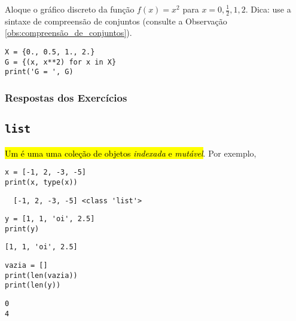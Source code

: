 \begin{exer}
  Aloque o gráfico discreto da função $f(x) = x^2$ para $x=0, \frac{1}{2}, 1, 2$. Dica: use a sintaxe de compreensão de conjuntos (consulte a Observação \ref{obs:compreensão_de_conjuntos}).
\end{exer}

\begin{resp}

\begin{lstlisting}
X = {0., 0.5, 1., 2.}
G = {(x, x**2) for x in X}
print('G = ', G)
\end{lstlisting}

\end{resp}

\ifisbook 
\subsubsection*{Respostas dos Exercícios}
\shipoutAnswer
\fi


\subsection{\texttt{list}}

\hl{Um {\PYTHONlist} é uma uma coleção de objetos \emph{indexada} e \emph{mutável}}. Por exemplo,

\begin{lstlisting}
x = [-1, 2, -3, -5]
print(x, type(x))
\end{lstlisting}

\begin{verbatim}
  [-1, 2, -3, -5] <class 'list'>
\end{verbatim}

\begin{lstlisting}
y = [1, 1, 'oi', 2.5]
print(y)
\end{lstlisting}

\begin{verbatim}
[1, 1, 'oi', 2.5]
\end{verbatim}

\begin{lstlisting}
vazia = []
print(len(vazia))
print(len(y))
\end{lstlisting}

\begin{verbatim}
0
4
\end{verbatim}

